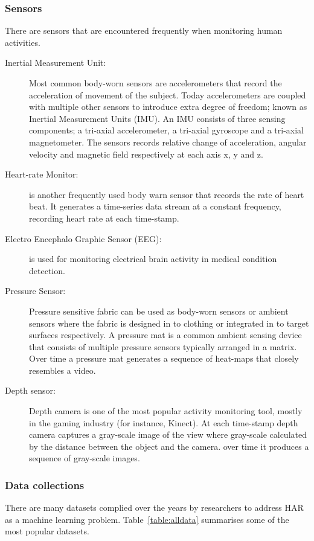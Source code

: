 \documentclass[runningheads]{llncs}
\begin{document}
\subsubsection{Sensors}
There are sensors that are encountered frequently when monitoring human activities.
\begin{description}
\item[Inertial Measurement Unit:] Most common body-worn sensors are accelerometers that record the acceleration of movement of the subject. Today accelerometers are coupled with multiple other sensors to introduce extra degree of freedom; known as Inertial Measurement Units (IMU). An IMU consists of three sensing components; a tri-axial accelerometer, a tri-axial gyroscope and a tri-axial magnetometer. The sensors records relative change of acceleration, angular velocity and magnetic field respectively at each axis x, y and z. 
\item[Heart-rate Monitor:] is another frequently used body warn sensor that records the rate of heart beat. It generates a time-series data stream at a constant frequency, recording heart rate at each time-stamp. 
\item[Electro Encephalo Graphic Sensor (EEG):] is used for monitoring electrical brain activity in medical condition detection.
\item[Pressure Sensor:] Pressure sensitive fabric can be used as body-worn sensors or ambient sensors where the fabric is designed in to clothing or integrated in to target surfaces respectively. A pressure mat is a common ambient sensing device that consists of multiple pressure sensors typically arranged in a matrix. Over time a pressure mat generates a sequence of heat-maps that closely resembles a video. 
\item[Depth sensor:] Depth camera is one of the most popular activity monitoring tool, mostly in the gaming industry (for instance, Kinect). At each time-stamp depth camera captures a gray-scale image of the view where gray-scale calculated by the distance between the object and the camera. over time it produces a sequence of gray-scale images.
\end{description}

\subsubsection{Data collections}
\label{sec:data}
There are many datasets complied over the years by researchers to address HAR as a machine learning problem. Table~\ref{table:alldata} summarises some of the most popular datasets. 
\end{document}
